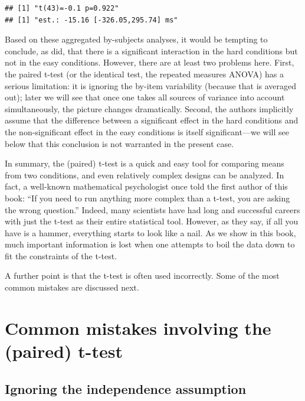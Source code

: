 \documentclass[
  12pt,
]{krantz}
\theoremstyle{definition}
\theoremstyle{definition}
\theoremstyle{definition}
\theoremstyle{definition}
\theoremstyle{remark}
\begin{document}
\begin{verbatim}
## [1] "t(43)=-0.1 p=0.922"
## [1] "est.: -15.16 [-326.05,295.74] ms"
\end{verbatim}

Based on these aggregated by-subjects analyses, it would be tempting to conclude, as \citet{fedorenko2006nature} did, that there is a significant interaction in the hard conditions but not in the easy conditions. However, there are at least two problems here. First,
the paired t-test (or the identical test, the repeated measures ANOVA) has a serious limitation: it is ignoring the by-item variability (because that is averaged out); later we will see that once one takes all sources of variance into account simultaneously, the picture changes dramatically. Second, the authors implicitly assume that the difference between a significant effect in the hard conditions and the non-significant effect in the easy conditions is itself significant---we will see below that this conclusion is not warranted in the present case.

In summary, the (paired) t-test is a quick and easy tool for comparing means from two conditions, and even relatively complex designs can be analyzed. In fact, a well-known mathematical psychologist once told the first author of this book: ``If you need to run anything more complex than a t-test, you are asking the wrong question.'' Indeed, many scientists have had long and successful careers with just the t-test as their entire statistical tool. However, as they say, if all you have is a hammer, everything starts to look like a nail. As we show in this book, much important information is lost when one attempts to boil the data down to fit the constraints of the t-test.

A further point is that the t-test is often used incorrectly. Some of the most common mistakes are discussed next.

\hypertarget{common-mistakes-involving-the-paired-t-test}{%
\section{Common mistakes involving the (paired) t-test}\label{common-mistakes-involving-the-paired-t-test}}

\hypertarget{ignoring-the-independence-assumption}{%
\subsection{Ignoring the independence assumption}\label{ignoring-the-independence-assumption}}
\end{document}
